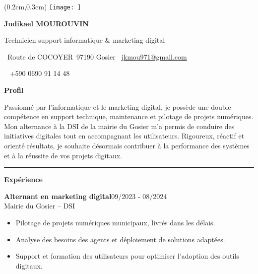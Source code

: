 \documentclass[a4paper]{article}
\renewcommand{\colorbox}[2]{#2}%
\newcommand{\fullrule}{\hspace{-1.5cm}\rule{\paperwidth}{0.4pt}}
\newcommand{\cvsection}[1]{%
  \vspace{6pt}\textbf{\Large #1}\par\vspace{2pt}}
\begin{document}
\color{white}
\ifx\relax\relax\else
\begin{textblock*}{4cm}(0.2cm,0.3cm)
  \texttt{[image: ]}
\end{textblock*}
 \fi
\begin{center}
  {\fontsize{44pt}{24pt}\selectfont\bfseries Judikael MOUROUVIN}

  \bigskip
  {\Large Technicien support informatique \& marketing digital}

  \bigskip\bigskip
  \faMapMarker~Route de COCOYER\ 97190 Gosier
  \quad\faEnvelope~\href{mailto:jkmou971@gmail.com}{jkmou971@gmail.com}

  \bigskip
  \faPhone~ +590 0690 91 14 48
  \quad \faLinkedin\ \href{}{}
 

  
\end{center}
 \vspace{0.6cm}
\cvsection{Profil}

Passionné par l’informatique et le marketing digital, je possède une double compétence en support technique, maintenance et pilotage de projets numériques. Mon alternance à la DSI de la mairie du Gosier m’a permis de conduire des initiatives digitales tout en accompagnant les utilisateurs. Rigoureux, réactif et orienté résultats, je souhaite désormais contribuer à la performance des systèmes et à la réussite de vos projets digitaux.

\medskip\fullrule

\cvsection{Expérience}
\vspace{0.5cm}
\colorbox{maincolor}{%
  \begin{minipage}{\linewidth}
    \noindent
    \textbf{Alternant en marketing digital}\hfill 09/2023 - 08/2024\\
    Mairie du Gosier – DSI\\[-0.3em]
    \begin{itemize}[leftmargin=*]
      \item Pilotage de projets numériques municipaux, livrés dans les délais. \item Analyse des besoins des agents et déploiement de solutions adaptées. \item Support et formation des utilisateurs pour optimiser l’adoption des outils digitaux.
    \end{itemize}
  \end{minipage}}
\end{document}
